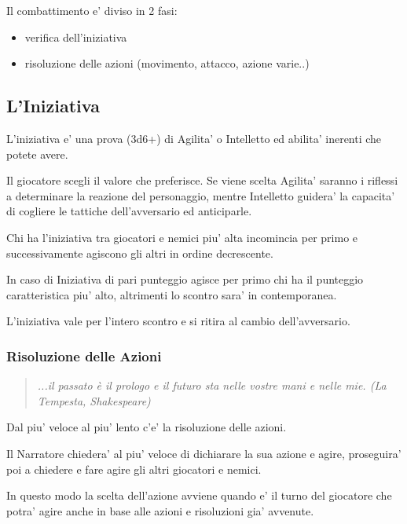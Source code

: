 \documentclass[a4paper,11pt,twoside,openany]{book}
\begin{document}
\bigskip

Il combattimento e' diviso in 2 fasi:
\begin{itemize}
\item verifica dell'iniziativa 
\item risoluzione delle azioni (movimento, attacco, azione varie..) 
\end{itemize}

\subsection{L'Iniziativa}

\label{liniziativa}

L'iniziativa e' una prova (3d6+) di Agilita' o Intelletto ed abilita' inerenti che potete avere.

Il giocatore scegli il valore che preferisce. Se viene scelta Agilita' saranno i riflessi a determinare la reazione del personaggio, mentre Intelletto guidera' la capacita' di cogliere le tattiche dell'avversario ed anticiparle.

Chi ha l'iniziativa tra giocatori e nemici piu' alta incomincia per primo e successivamente agiscono gli altri in ordine decrescente. 

In caso di Iniziativa di pari punteggio agisce per primo chi ha il punteggio caratteristica piu' alto, altrimenti lo scontro sara' in contemporanea.

L'iniziativa vale per l'intero scontro e si ritira al cambio dell'avversario.

\subsubsection{Risoluzione delle Azioni}

\begin{quote}\textit{
...il passato è il prologo e il futuro sta nelle vostre mani e nelle mie. (La Tempesta, Shakespeare)
}\end{quote}


\label{risoluzione-delle-azioni}

Dal piu' veloce al piu' lento c'e' la risoluzione delle azioni.

Il Narratore chiedera' al piu' veloce di dichiarare la sua azione e agire, proseguira' poi a chiedere e fare agire gli altri giocatori e nemici.

In questo modo la scelta dell'azione avviene quando e' il turno del giocatore che potra' agire anche in base alle azioni e risoluzioni gia' avvenute.
\end{document}
